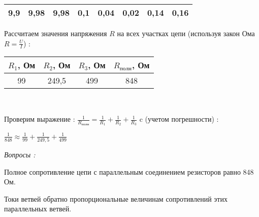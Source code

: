 \documentclass[a4paper,11pt]{article}
\begin{document}
\begin{flushleft}
\begin{center}
\begin{tabular}{|c|c|c|c|c|c|c|c|}
\hline 
 9,9 & 9,98 & 9,98 & 0,1 & 0,04 & 0,02 & 0,14 & 0,16 \tabularnewline
\hline 
\end{tabular}
	\end{center}
	Рассчитаем значения напряжения ${R}$ на всех участках цепи (используя закон Ома ${R=\frac{U}{I}}$) :
		\begin{center}
		\begin{tabular}{|c|c|c|c|}
\hline ${R_{1}}$,  Ом & ${R_{2}}$,  Ом & ${R_{3}}$,  Ом & ${R_{полн}}$,  Ом \\ 
\hline  99  & 249,5 & 499 & 848 \\ 
\hline 
\end{tabular}
	\\
	\medskip 
	\end{center}
	Проверим выражение : ${\frac{1}{R_{полн}}} = \frac{1}{R_1} + \frac{1}{R_2} + \frac{1}{R_3}$ c (учетом погрешности) :
	\begin{center}
		${\frac{1}{848} \approx \frac{1}{99} + \frac{1}{249,5} + \frac{1}{499} }$
	\end{center}
	\textit{Вопросы : }\\
		\begin{list}{}{\leftmargin=3cm}	
			\item Полное сопротивление цепи с параллельным соединением резисторов равно 848 Ом.	 	
	        \item Токи ветвей обратно пропорциональные величинам сопротивлений этих параллельных ветвей.
	     \end{list}   	
	\end{flushleft}
	\newpage
\end{document}
